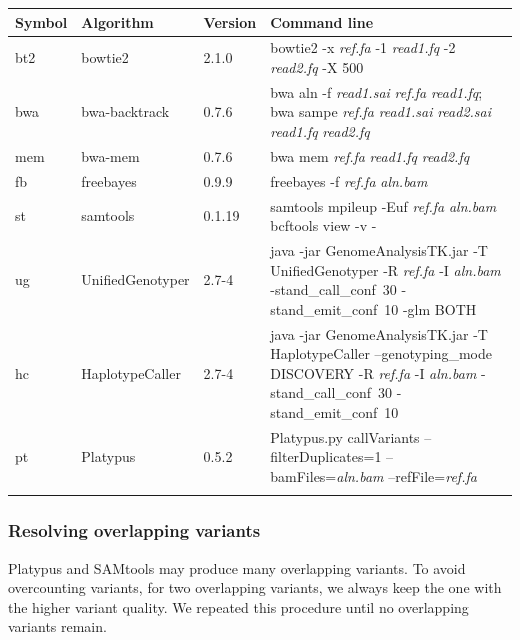 \documentclass{bioinfo-ori}
\begin{document}
\begin{methods}
\begin{table}
\footnotesize
{}
{\begin{tabular*}{\textwidth}{@{\extracolsep{\fill}}lp{1.8cm}lp{12.5cm}}
\toprule
Symbol & Algorithm & Version & Command line \\
\midrule
bt2 & bowtie2 & 2.1.0 & bowtie2 -x \emph{ref.fa} -1 \emph{read1.fq} -2 \emph{read2.fq} -X 500 \\
bwa & bwa-backtrack & 0.7.6 & bwa aln -f \emph{read1.sai} \emph{ref.fa} \emph{read1.fq}; bwa sampe \emph{ref.fa} \emph{read1.sai} \emph{read2.sai} \emph{read1.fq} \emph{read2.fq} \\
mem & bwa-mem & 0.7.6 & bwa mem \emph{ref.fa} \emph{read1.fq} \emph{read2.fq} \\
fb & freebayes & 0.9.9 & freebayes -f \emph{ref.fa} \emph{aln.bam} \\
st & samtools & 0.1.19 & samtools mpileup -Euf \emph{ref.fa} \emph{aln.bam} {\tt \char124} bcftools view -v - \\
ug & UnifiedGenotyper & 2.7-4 & java -jar GenomeAnalysisTK.jar -T UnifiedGenotyper -R \emph{ref.fa} -I \emph{aln.bam} \mbox{-stand\_call\_conf 30} \mbox{-stand\_emit\_conf 10} -glm BOTH \\
hc & HaplotypeCaller & 2.7-4 & java -jar GenomeAnalysisTK.jar -T HaplotypeCaller --genotyping\_mode DISCOVERY -R \emph{ref.fa} -I \emph{aln.bam} \mbox{-stand\_call\_conf 30} \mbox{-stand\_emit\_conf 10} \\
pt & Platypus & 0.5.2 & Platypus.py callVariants --filterDuplicates=1 --bamFiles=\emph{aln.bam} --refFile=\emph{ref.fa} \\
\botrule
\end{tabular*}}{}
\end{table}

\subsubsection{Resolving overlapping variants} Platypus and SAMtools may
produce many overlapping variants. To avoid overcounting variants, for two
overlapping variants, we always keep the one with the higher variant quality.
We repeated this procedure until no overlapping variants remain.


\end{methods}
\end{document}
